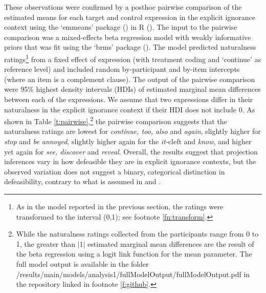 \documentclass[11pt,fleqn]{article}
\newcommand{\6}{\mbox{$[\hspace*{-.6mm}[$}}
\newcommand{\9}{\mbox{$]\hspace*{-.6mm}]$}}
\begin{document}
These observations were confirmed by a posthoc pairwise comparison of the estimated means for each target and control expression in the explicit ignorance context using the `emmeans' package (\citealt{emmeans}) in R (\citealt{r}). The input to the pairwise comparison was a mixed-effects beta regression model with weakly informative priors that was fit using the `brms' package (\citealt{buerkner2017}). The model predicted naturalness ratings\footnote{As in the model reported in the previous section, the ratings were transformed to the interval (0,1); see footnote \ref{fn:transform}.} from a fixed effect of expression (with treatment coding and `continue' as reference level) and included random by-participant and by-item intercepts (where an item is a complement clause). The output of the pairwise comparison were 95\% highest density intervals (HDIs) of estimated marginal mean differences between each of the expressions. We assume that two expressions differ in their naturalness in the explicit ignorance context if their HDI does not include 0. As shown in Table \ref{t:pairwise},\footnote{While the naturalness ratings collected from the participants range from 0 to 1, the greater than $|$1$|$  estimated marginal mean differences are the result of the beta regression using a logit link function for the mean parameter. The full model output is available in the folder /results/main/models/analysis1/fullModelOutput/fullModelOutput.pdf in the repository linked in footnote \ref{f:github}.} the pairwise comparison suggests that the naturalness ratings are lowest for \emph{continue, too, also} and \emph{again}, slightly higher for \emph{stop} and \emph{be annoyed}, slightly higher again for the {\em it-}cleft and \emph{know}, and higher yet again for \emph{see, discover} and \emph{reveal}. Overall, the results suggest that projection inferences vary in how defeasible they are in explicit ignorance contexts, but the observed variation does not suggest a binary, categorical distinction in defeasibility, contrary to what is assumed in \citealt{simons01} and \citealt{abusch10}.
\end{document}
